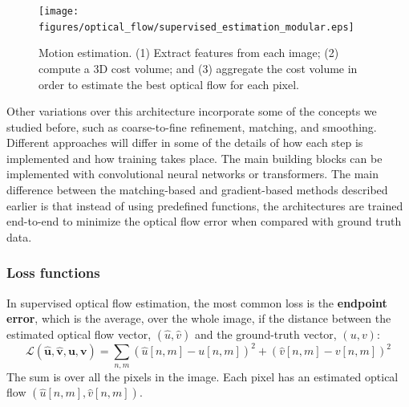 \vspace{-.2in}
\begin{figure}[h!]
    \centerline{
        \texttt{[image: figures/optical\_flow/supervised\_estimation\_modular.eps]}}
    \caption{Motion estimation. (1) Extract
        features from each image;
        (2) compute a 3D cost volume;
        and (3) aggregate the
        cost volume in order to
        estimate the best optical
        flow for each pixel.
    }
    \label{fig:supervised_estimation_modular}
\end{figure}


Other variations over this architecture incorporate some of the concepts we studied before, such as coarse-to-fine refinement, matching, and smoothing. Different approaches will differ in some of the details of how each step is implemented and how training takes place. The main building blocks can be implemented with convolutional neural networks or transformers.
The main difference between the matching-based and gradient-based methods described earlier is that instead of using predefined functions, the architectures are trained end-to-end to minimize the optical flow error when compared with ground truth data.


\subsubsection{Loss functions}
In supervised optical flow estimation, the most common loss is the {\bf endpoint error},
which is the average, over the whole image, if the distance between the estimated optical flow vector, $(\hat{u},\hat{v})$ and the ground-truth vector, $(u,v)$:
\begin{equation}
    \mathcal{L} \left( \hat{\mathbf{u}}, \hat{\mathbf{v}}, \mathbf{u}, \mathbf{v} \right) =
    \sum_{n,m} (\hat{u}[n,m] - u[n,m])^2 + (\hat{v}[n,m] - v[n,m])^2
\end{equation}
The sum is over all the pixels in the image. Each pixel has an estimated optical flow $(\hat{u}[n,m],\hat{v}[n,m])$.

